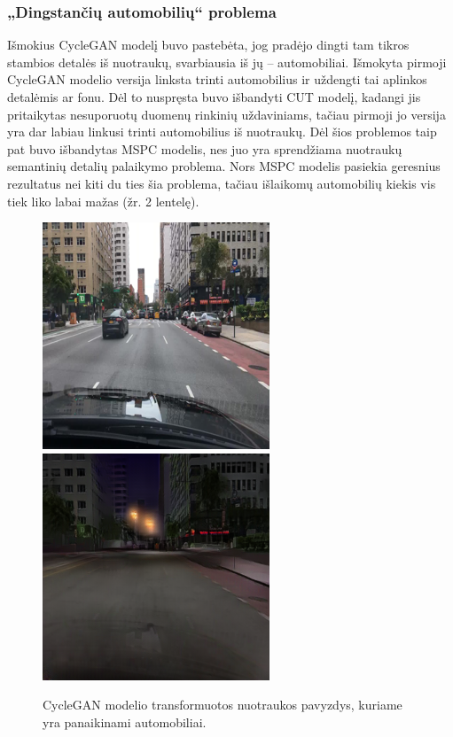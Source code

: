 \documentclass{VUMIFPSbakalaurinis}
\begin{document}
        \subsubsection{„Dingstančių automobilių“ problema}
            Išmokius CycleGAN modelį buvo pastebėta, jog pradėjo dingti tam tikros stambios detalės iš nuotraukų, svarbiausia iš jų – automobiliai. Išmokyta pirmoji CycleGAN modelio versija linksta trinti automobilius ir uždengti tai aplinkos detalėmis ar fonu. Dėl to nuspręsta buvo išbandyti CUT modelį, kadangi jis pritaikytas nesuporuotų duomenų rinkinių uždaviniams, tačiau pirmoji jo versija yra dar labiau linkusi trinti automobilius iš nuotraukų. Dėl šios problemos taip pat buvo išbandytas MSPC modelis, nes juo yra sprendžiama nuotraukų semantinių detalių palaikymo problema. Nors MSPC modelis pasiekia geresnius rezultatus nei kiti du ties šia problema, tačiau išlaikomų automobilių kiekis vis tiek liko labai mažas (žr. 2 lentelę).
            \begin{figure}[H]
                \centering
                \includegraphics[scale=0.8]{img/CycleGANV1/1_real_B}
                \includegraphics[scale=0.8]{img/CycleGANV1/1_fake_A}
                \captionsetup{width=.8\linewidth}
                \caption{CycleGAN modelio transformuotos nuotraukos pavyzdys, kuriame yra panaikinami automobiliai.}
                \label{img:mlp}
            \end{figure}
\end{document}

